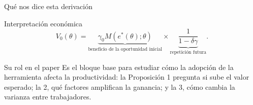 \documentclass[aspectratio=169,11pt]{beamer}
\begin{document}
\begin{frame}{Qué nos dice esta derivación}
  \begin{block}{Interpretación económica}
    \[
      V_0(\theta)
      =\underbrace{\gamma_0M(e^*(\theta);\theta)}_{\text{beneficio de la oportunidad inicial}}
      \times
      \underbrace{\frac{1}{1-\delta\gamma}}_{\text{repetición futura}}.
    \]
  \end{block}

  \begin{block}{Su rol en el paper}
    Es el bloque base para estudiar cómo la adopción de la herramienta afecta
    la productividad: la Proposición 1 pregunta si sube el valor esperado; la 2,
    qué factores amplifican la ganancia; y la 3, cómo cambia la varianza entre
    trabajadores.
  \end{block}

\end{frame}
\end{document}
